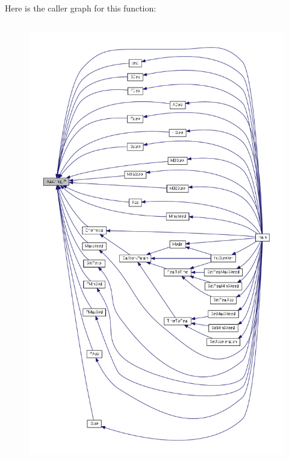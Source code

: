 Here is the caller graph for this function\-:
\nopagebreak
\begin{figure}[H]
\begin{center}
\leavevmode
\includegraphics[height=550pt]{group__biba__utils_gaf1b54c4c5b890362b485636395859b3d_icgraph}
\end{center}
\end{figure}


